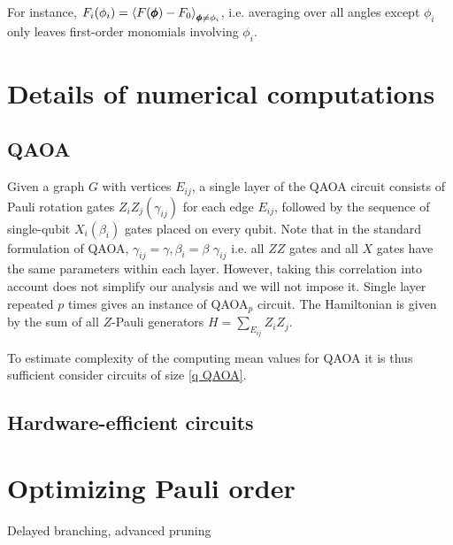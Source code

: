 \documentclass[twocolumn, amsfonts, amssymb, aps, nofootinbib]{revtex4-2}
\begin{document}
 For instance, $F_i(\phi_i)=\Braket{F(\pmb\phi)-F_0}_{\pmb\phi\neq\phi_i}$, i.e. averaging over all angles except $\phi_i$ only leaves first-order monomials involving $\phi_i$. 
\section{Details of numerical computations}
\subsection{QAOA} \label{app QAOA}
Given a graph $G$ with vertices $E_{ij}$, a single layer of the QAOA circuit consists of Pauli rotation gates $Z_iZ_j(\gamma_{ij})$ for each edge $E_{ij}$, followed by the sequence of single-qubit $X_i(\beta_i)$ gates placed on every qubit. Note that in the standard formulation of QAOA, $\gamma_{ij}=\gamma, \beta_i=\beta$ $\gamma_{ij}$ i.e. all $ZZ$ gates and all $X$ gates have the same parameters within each layer. However, taking this correlation into account does not simplify our analysis and we will not impose it. Single layer repeated $p$ times gives an instance of QAOA${}_p$ circuit. The Hamiltonian is given by the sum of all $Z$-Pauli generators $H=\sum_{E_{ij}}Z_iZ_j$.

 To estimate complexity of the computing mean values for QAOA it is thus sufficient consider circuits of size \eqref{q QAOA}.
\subsection{Hardware-efficient circuits} \label{app HEA}


\section{Optimizing Pauli order}
Delayed branching, advanced pruning


\end{document}
